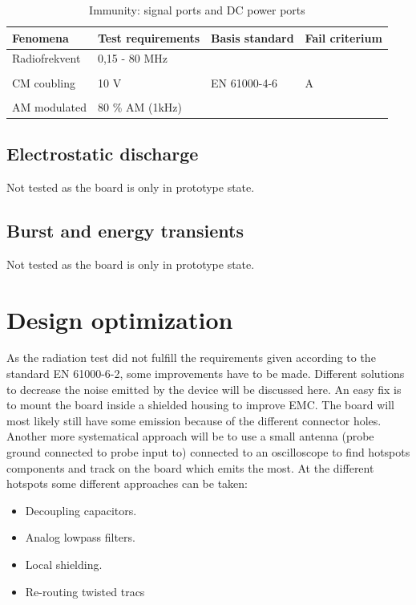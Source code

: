 \begin{table}[H]
		\begin{center}
		\begin{tabular}{|l|l|l|l|}\hline
			Fenomena 		& Test requirements		& Basis standard 	& Fail criterium	\\\hline
			Radiofrekvent		& 0,15 - 80 MHz		& 				& 			\\
							&					&				&			\\
			CM coubling		& 10 V				& EN 61000-4-6	& A			\\
							&					&				&			\\
			AM modulated		& 80 \% AM (1kHz)		& 				&			\\\hline
		\end{tabular}
		\end{center}
	\caption{Immunity: signal ports and DC power ports}
\end{table}

\subsection{Electrostatic discharge}
Not tested as the board is only in prototype state.

\subsection{Burst and energy transients}
Not tested as the board is only in prototype state.

\section{Design optimization}\label{sec:design_optimization}
As the radiation test did not fulfill the requirements given according to the standard EN 61000-6-2, some improvements have to be made. Different solutions to decrease the noise emitted by the device will be discussed here.
\p An easy fix is to mount the board inside a shielded housing to improve EMC. The board will most likely still have some emission because of the different connector holes.
\p Another more systematical approach will be to use a small antenna (probe ground connected to probe input to) connected to an oscilloscope to find hotspots components and track on the board which emits the most. At the different hotspots some different approaches can be taken:
\begin{itemize}
	\item Decoupling capacitors.
	\item Analog lowpass filters.
	\item Local shielding.
	\item Re-routing twisted tracs	
\end{itemize} 





